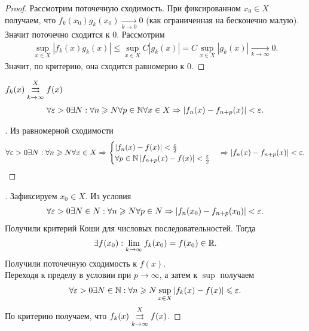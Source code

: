 \documentclass[../main.tex]{subfiles}
\begin{document}
 
 \begin{proof}
   Рассмотрим поточечную сходимость. При фиксированном $ x_0 \in X$ получаем, что $ f_k (x_0 ) g_k (x_0 )  \xrightarrow[k \to  0 ]{} 0 $ (как ограниченная на бесконечно малую). Значит поточечно сходится к $ 0$. Рассмотрим 
   \begin{gather} 
     \sup_{x \in X} \left| f_k(x)  g_k(x)  \right| \leq \sup_{x\in X} C \left| g_k(x)  \right|   = C \sup_{x \in X} \left| g_k(x)  \right|  \xrightarrow[k \to  \infty ]{} 0.
   \end{gather} 
   Значит, по критерию, она сходится равномерно к $ 0$. 
 \end{proof}

 
 \begin{proposition}
   $ f_k(x)  \convergesuniformly{k \to \infty}{X} f(x)$ \nas 
   \begin{gather} 
    \forall \eps > 0 \exists N: \forall n \geq N \forall p \in \N \forall x \in X \hence \left| f_n(x) - f_{n+p}(x) \right| < \eps .
   \end{gather}
 \end{proposition}
 
 
 \begin{proof}[\circled{\hence}]
  Из равномерной сходимости 
  \begin{gather} 
    \forall \eps > 0 \exists N : \forall n \geq N \forall x \in X \hence \System{\left| f_n(x) - f(x) \right| < \frac{\eps}{2} \\ \forall p \in \N \left| f_{n+p}(x) - f(x) \right| < \frac{\eps}{2}} \hence \left| f_n(x) - f_{n+p}(x) \right| < \eps.
  \end{gather} 
 \end{proof}
 
 \begin{proof}[\circled{\lhence}]
   Зафиксируем $ x_0 \in X$. Из условия 
   \begin{gather} 
     \forall \eps > 0 \exists N \in N: \forall n \geq N \forall p \in N \hence \left| f_n(x_0 ) - f_{n+p}(x_0) \right| < \eps .
   \end{gather}
   Получили критерий Коши для числовых последовательностей. Тогда 
   \begin{gather} 
     \exists f(x_0 ) : \lim_{k \to \infty} f_k(x_0) = f(x_0 ) \in \R .
   \end{gather}
   Получили поточечную сходимость к $ f(x)$. \\
   Переходя к пределу в условии при $ p \to \infty$, а затем к $ \sup$ получаем 
   \begin{gather} 
     \forall \eps > 0 \exists N \in \N : \forall n \geq N \sup_{x\in X} \left| f_k(x) - f(x) \right| \leq \eps .
   \end{gather}  
   По критерию получаем, что $ f_k(x)  \convergesuniformly{k \to \infty}{X} f(x)$.
 \end{proof}
 
\end{document}
